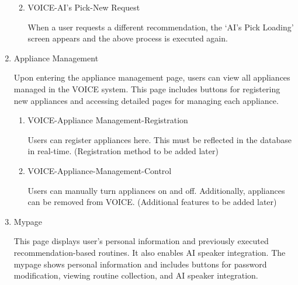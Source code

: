 \documentclass[conference]{IEEEtran}
\begin{document}
\begin{enumerate}[label=\arabic*]
\begin{enumerate}[label=\arabic*)]
         \vspace{1em}

         \item VOICE-AI's Pick-New Request\par
         \vspace{0.3em}
         When a user requests a different recommendation, the ‘AI's Pick Loading’ screen appears and the above process is executed again.
    \end{enumerate}

    \vspace{1em}

    \item Appliance Management\par
    \vspace{0.3em}
    Upon entering the appliance management page, users can view all appliances managed in the VOICE system. This page includes buttons for registering new appliances and accessing detailed pages for managing each appliance.
    \vspace{0.3em}

    \begin{enumerate}[label=\arabic*)]
        \item VOICE-Appliance Management-Registration\par
        \vspace{0.3em}
        Users can register appliances here. This must be reflected in the database in real-time. (Registration method to be added later)

        \vspace{1em}

        \item VOICE-Appliance-Management-Control\par
        \vspace{0.3em}
        Users can manually turn appliances on and off. Additionally, appliances can be removed from VOICE. (Additional features to be added later)
    \end{enumerate}

    \vspace{1em}

    \item Mypage\par
    \vspace{0.3em}
    This page displays user's personal information and previously executed recommendation-based routines. It also enables AI speaker integration. The mypage shows personal information and includes buttons for password modification, viewing routine collection, and AI speaker integration.
    \vspace{0.3em}


\end{enumerate}
\end{document}
